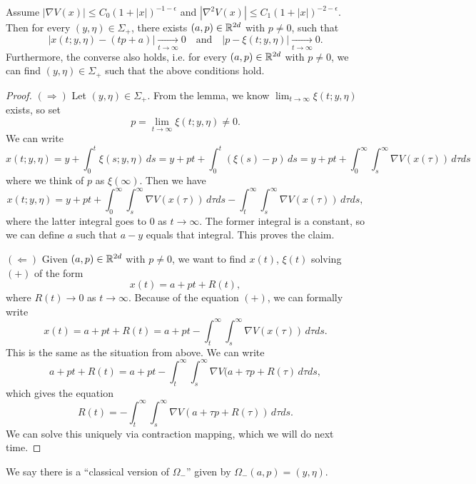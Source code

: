 \begin{prop}
  Assume $|\nabla V(x)| \le C_0 (1 + |x|)^{-1 - \epsilon}$
  and $|\nabla^2 V(x)| \le C_1 (1 + |x|)^{-2 - \epsilon}$.
  Then for every $(y, \eta) \in \Sigma_+$,
  there exists $(a, p) \in \mathbb{R}^{2d}$ with
  $p \ne 0$, such that
  \[
    |x(t; y, \eta) - (tp + a)| \xrightarrow[t \to \infty]{} 0 \quad \text{and} \quad
    |p - \xi(t; y, \eta)| \xrightarrow[t \to \infty]{} 0.
  \]
  Furthermore, the converse also holds, i.e.
  for every $(a, p) \in \mathbb{R}^{2d}$ with $p \ne 0$,
  we can find $(y, \eta) \in \Sigma_+$ such that
  the above conditions hold.
\end{prop}

\begin{proof}
  $(\Rightarrow)$ Let $(y, \eta) \in \Sigma_+$.
  From the lemma, we know
  $\lim_{t \to \infty} \xi(t; y, \eta)$ exists,
  so set
  \[
    p = \lim_{t \to \infty} \xi(t; y, \eta) \ne 0.
  \]
  We can write
  \[
    x(t; y, \eta)
    = y + \int_0^t \xi(s; y, \eta) \, ds
    = y + p t + \int_0^t (\xi(s) - p)\, ds
    = y + pt + \int_0^\infty \int_s^\infty \nabla V(x(\tau))\, d\tau ds
  \]
  where we think of $p$ as $\xi(\infty)$. Then 
  we have
  \[
    x(t; y, \eta) =
    y + pt + \int_0^\infty \int_s^\infty \nabla V(x(\tau))\, d\tau ds
    - \int_t^\infty \int_s^\infty \nabla V(x(\tau))\, d\tau ds,
  \]
  where the latter integral goes to $0$ as
  $t \to \infty$. The former integral is
  a constant, so we can define $a$ such that
  $a - y$ equals that integral. This proves
  the claim.

  $(\Leftarrow)$ Given $(a, p) \in \mathbb{R}^{2d}$ with
  $p \ne 0$, we want to find $x(t)$, $\xi(t)$
  solving $(+)$ of the form
  \[
    x(t) = a + pt + R(t),
  \]
  where $R(t) \to 0$ as $t \to \infty$. Because
  of the equation $(+)$, we can formally write
  \[
    x(t) = a + pt + R(t)
    = a + pt - \int_t^\infty \int_s^\infty \nabla V(x(\tau))\, d\tau ds.
  \]
  This is the same as the situation from above.
  We can write
  \[
    a + pt + R(t) = a + pt
    - \int_t^\infty \int_s^\infty \nabla V(a + \tau p + R(\tau)\, d\tau ds,
  \]
  which gives the equation
  \[
    R(t) = -\int_t^\infty \int_s^\infty \nabla V(a + \tau p + R(\tau))\, d\tau ds.
  \]
  We can solve this uniquely via
  contraction mapping, which we will do
  next time.
\end{proof}

\begin{remark}
  We say there is a ``classical version of
  $\Omega_-$'' given by
  $\Omega_-(a, p) = (y, \eta)$.
\end{remark}
